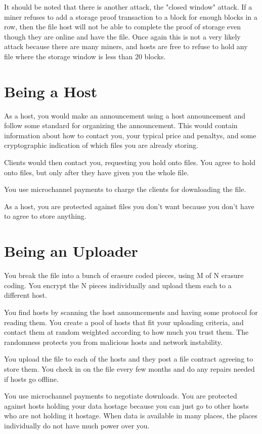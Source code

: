 \documentclass[twocolumn]{article}
\begin{document}
It should be noted that there is another attack, the "closed window" attack.
If a miner refuses to add a storage proof transaction to a block for enough blocks in a row, then the file host will not be able to complete the proof of storage even though they are online and have the file.
Once again this is not a very likely attack because there are many miners, and hosts are free to refuse to hold any file where the storage window is less than 20 blocks.

\section{Being a Host}
As a host, you would make an announcement using a host announcement and follow some standard for organizing the announcement.
This would contain information about how to contact you, your typical price and penaltys, and some cryptographic indication of which files you are already storing.

Clients would then contact you, requesting you hold onto files.
You agree to hold onto files, but only after they have given you the whole file.

You use microchannel payments to charge the clients for downloading the file.

As a host, you are protected against files you don't want because you don't have to agree to store anything.

\section{Being an Uploader}
You break the file into a bunch of erasure coded pieces, using M of N erasure coding.
You encrypt the N pieces individually and upload them each to a different host.

You find hosts by scanning the host announcements and having some protocol for reading them.
You create a pool of hosts that fit your uploading criteria, and contact them at random weighted according to how much you trust them.
The randomness protects you from malicious hosts and network instability.

You upload the file to each of the hosts and they post a file contract agreeing to store them.
You check in on the file every few months and do any repairs needed if hosts go offline.

You use microchannel payments to negotiate downloads.
You are protected against hosts holding your data hostage because you can just go to other hosts who are not holding it hostage.
When data is available in many places, the places individually do not have much power over you.
\end{document}
